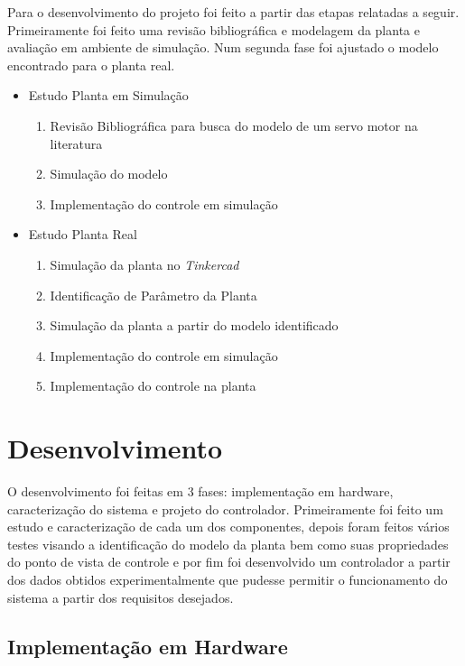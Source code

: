 \documentclass[a4paper,11pt]{article}
\begin{document}
Para o desenvolvimento do projeto foi feito a partir das etapas relatadas a seguir. Primeiramente foi feito uma revisão bibliográfica e modelagem da planta e avaliação em ambiente de simulação. Num segunda fase foi ajustado o modelo encontrado para o planta real.

\begin{itemize}
    \item Estudo Planta em Simulação
    \begin{enumerate}
        \item Revisão Bibliográfica para busca do modelo de um servo motor na literatura
        \item Simulação do modelo
        \item Implementação do controle em simulação
    \end{enumerate}
    \item Estudo Planta Real
    \begin{enumerate}
        \item Simulação da planta no \textit{Tinkercad}
        \item Identificação de Parâmetro da Planta
        \item Simulação da planta a partir do modelo identificado
        \item Implementação do controle em simulação
        \item Implementação do controle na planta
    \end{enumerate}
\end{itemize}

\section{Desenvolvimento}

O desenvolvimento foi feitas em 3 fases: implementação em hardware, caracterização do sistema e projeto do controlador. Primeiramente foi feito um estudo e caracterização de cada um dos componentes, depois foram feitos vários testes visando a identificação do modelo da planta bem como suas propriedades do ponto de vista de controle e por fim foi desenvolvido um controlador a partir dos dados obtidos experimentalmente que pudesse permitir o funcionamento do sistema a partir dos requisitos desejados.

\subsection{Implementação em Hardware}
\end{document}
